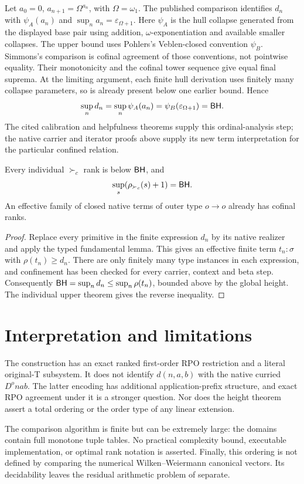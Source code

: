 \documentclass[11pt,a4paper]{article}
\newcommand{\rk}{\rho}
\begin{document}
Let $a_0=0$, $a_{n+1}=\Omega^{a_n}$, with $\Omega=\omega_1$.
The published comparison identifies $d_n$ with $\psi_A(a_n)$ and
$\sup_na_n=\varepsilon_{\Omega+1}$. Here $\psi_A$ is the hull collapse
generated from the displayed base pair using addition, $\omega$-exponentiation
and available smaller collapses. The upper bound uses Pohlers's
Veblen-closed convention $\psi_B$. Simmons's comparison is cofinal agreement
of those conventions, not pointwise equality. Their monotonicity and the
cofinal tower sequence give equal final suprema. At the limiting argument,
each finite hull derivation uses finitely many collapse parameters, so is
already present below one earlier bound. Hence
\[
 \sup_nd_n=\sup_n\psi_A(a_n)
   =\psi_B(\varepsilon_{\Omega+1})=\mathsf{BH}.
\]
The cited calibration and helpfulness theorems supply this ordinal-analysis
step; the native carrier and iterator proofs above supply its new term
interpretation for the particular confined relation.

\begin{theorem}\label{thm:height}
Every individual $\succ_c$ rank is below $\mathsf{BH}$, and
\[
 \sup_s(\rk_{\succ_c}(s)+1)=\BH.
\]
An effective family of closed native terms of outer type $o\to o$ already
has cofinal ranks.
\end{theorem}
\begin{proof}
Replace every primitive in the finite expression $d_n$ by its native realizer
and apply the typed fundamental lemma.  This gives an effective finite term
$t_n:\sigma$ with $\rk(t_n)\ge d_n$.  There are only finitely many type
instances in each expression, and confinement has been checked for every
carrier, context and beta step.  Consequently
$\BH=\sup_nd_n\le\sup_n\rk(t_n)$, bounded above by the global height.
The individual upper theorem gives the reverse inequality.
\end{proof}

\section{Interpretation and limitations}
The construction has an exact ranked first-order RPO restriction and a literal
original-T subsystem.  It does not identify $d(n,a,b)$ with the native curried
$D^o n a b$.  The latter encoding has additional application-prefix structure,
and exact RPO agreement under it is a stronger question.  Nor does the height
theorem assert a total ordering or the order type of any linear extension.

The comparison algorithm is finite but can be extremely large: the domains
contain full monotone tuple tables.  No practical complexity bound, executable
implementation, or optimal rank notation is asserted.  Finally, this ordering
is not defined by comparing the numerical Wilken--Weiermann canonical vectors.
Its decidability leaves the residual arithmetic problem of
\cite{wwfoundations,wwexpressivity} separate.


\end{document}
